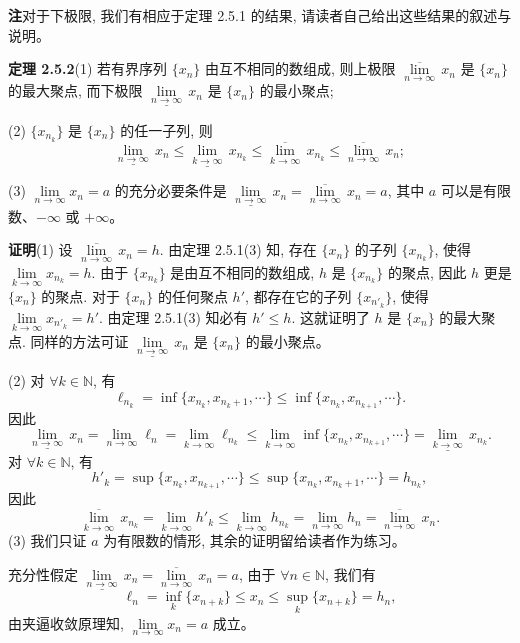 \documentclass[UTF8, 12pt, fontset=fandol, oneside]{ctexart}
\begin{document}
\noindent\textbf{注}\quad 对于下极限, 我们有相应于定理 2.5.1 的结果, 请读者自己给出这些结果的叙述与说明。

\noindent\textbf{定理 2.5.2}\quad (1) 若有界序列 $\{x_n\}$ 由互不相同的数组成, 则上极限 $\overline{\lim\limits_{n\to\infty}}\,x_n$ 是 $\{x_n\}$ 的最大聚点, 而下极限 $\underline{\lim\limits_{n\to\infty}}\,x_n$ 是 $\{x_n\}$ 的最小聚点;

(2) $\{x_{n_k}\}$ 是 $\{x_n\}$ 的任一子列, 则
\[
  \underline{\lim_{n\to\infty}}\,x_n
  \leqslant
  \underline{\lim_{k\to\infty}}\,x_{n_k}
  \leqslant
  \overline{\lim_{k\to\infty}}\,x_{n_k}
  \leqslant
  \overline{\lim_{n\to\infty}}\,x_n;
\]

(3) $\lim\limits_{n\to\infty}x_n=a$ 的充分必要条件是 $\underline{\lim\limits_{n\to\infty}}\,x_n=\overline{\lim\limits_{n\to\infty}}\,x_n=a$, 其中 $a$ 可以是有限数、$-\infty$ 或 $+\infty$。

\noindent\textbf{证明}\quad (1) 设 $\overline{\lim\limits_{n\to\infty}}\,x_n=h$. 由定理 2.5.1(3) 知, 存在 $\{x_n\}$ 的子列 $\{x_{n_k}\}$, 使得 $\lim\limits_{k\to\infty}x_{n_k}=h$. 由于 $\{x_{n_k}\}$ 是由互不相同的数组成, $h$ 是 $\{x_{n_k}\}$ 的聚点, 因此 $h$ 更是 $\{x_n\}$ 的聚点. 对于 $\{x_n\}$ 的任何聚点 $h'$, 都存在它的子列 $\{x_{n'_k}\}$, 使得 $\lim\limits_{k\to\infty}x_{n'_k}=h'$. 由定理 2.5.1(3) 知必有 $h'\leqslant h$. 这就证明了 $h$ 是 $\{x_n\}$ 的最大聚点. 同样的方法可证 $\underline{\lim\limits_{n\to\infty}}\,x_n$ 是 $\{x_n\}$ 的最小聚点。

(2) 对 $\forall k\in\mathbb{N}$, 有
\[
  \ell_{n_k}=\inf\{x_{n_k},x_{n_k+1},\cdots\}
  \leqslant
  \inf\{x_{n_k},x_{n_{k+1}},\cdots\}.
\]
因此
\[
  \underline{\lim_{n\to\infty}}\,x_n
  =
  \lim_{n\to\infty}\ell_n
  =
  \lim_{k\to\infty}\ell_{n_k}
  \leqslant
  \lim_{k\to\infty}\inf\{x_{n_k},x_{n_{k+1}},\cdots\}
  =
  \underline{\lim_{k\to\infty}}\,x_{n_k}.
\]
对 $\forall k\in\mathbb{N}$, 有
\[
  h'_k=\sup\{x_{n_k},x_{n_{k+1}},\cdots\}
  \leqslant
  \sup\{x_{n_k},x_{n_k+1},\cdots\}=h_{n_k},
\]
因此
\[
  \overline{\lim_{k\to\infty}}\,x_{n_k}
  =
  \lim_{k\to\infty}h'_k
  \leqslant
  \lim_{k\to\infty}h_{n_k}
  =
  \lim_{n\to\infty}h_n
  =
  \overline{\lim_{n\to\infty}}\,x_n.
\]
(3) 我们只证 $a$ 为有限数的情形, 其余的证明留给读者作为练习。

充分性\quad 假定 $\underline{\lim\limits_{n\to\infty}}\,x_n=\overline{\lim\limits_{n\to\infty}}\,x_n=a$, 由于 $\forall n\in\mathbb{N}$, 我们有
\[
  \ell_n=\inf_k\{x_{n+k}\}\leqslant x_n\leqslant\sup_k\{x_{n+k}\}=h_n,
\]
由夹逼收敛原理知, $\lim\limits_{n\to\infty}x_n=a$ 成立。
\end{document}
